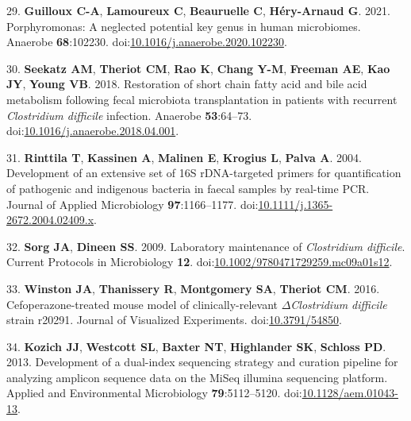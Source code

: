 \documentclass[
  12pt,
]{article}
\newenvironment{cslreferences}%
  {}%
  {\par}
\begin{document}
\begin{cslreferences}
\leavevmode\hypertarget{ref-Guilloux2021}{}%
29. \textbf{Guilloux C-A}, \textbf{Lamoureux C}, \textbf{Beauruelle C},
\textbf{Héry-Arnaud G}. 2021. Porphyromonas: A neglected potential key
genus in human microbiomes. Anaerobe \textbf{68}:102230.
doi:\href{https://doi.org/10.1016/j.anaerobe.2020.102230}{10.1016/j.anaerobe.2020.102230}.

\leavevmode\hypertarget{ref-Seekatz2018}{}%
30. \textbf{Seekatz AM}, \textbf{Theriot CM}, \textbf{Rao K},
\textbf{Chang Y-M}, \textbf{Freeman AE}, \textbf{Kao JY}, \textbf{Young
VB}. 2018. Restoration of short chain fatty acid and bile acid
metabolism following fecal microbiota transplantation in patients with
recurrent \emph{Clostridium difficile} infection. Anaerobe
\textbf{53}:64--73.
doi:\href{https://doi.org/10.1016/j.anaerobe.2018.04.001}{10.1016/j.anaerobe.2018.04.001}.

\leavevmode\hypertarget{ref-Rinttila2004}{}%
31. \textbf{Rinttila T}, \textbf{Kassinen A}, \textbf{Malinen E},
\textbf{Krogius L}, \textbf{Palva A}. 2004. Development of an extensive
set of 16S rDNA-targeted primers for quantification of pathogenic and
indigenous bacteria in faecal samples by real-time PCR. Journal of
Applied Microbiology \textbf{97}:1166--1177.
doi:\href{https://doi.org/10.1111/j.1365-2672.2004.02409.x}{10.1111/j.1365-2672.2004.02409.x}.

\leavevmode\hypertarget{ref-Sorg2009}{}%
32. \textbf{Sorg JA}, \textbf{Dineen SS}. 2009. Laboratory maintenance
of \emph{Clostridium difficile}. Current Protocols in Microbiology
\textbf{12}.
doi:\href{https://doi.org/10.1002/9780471729259.mc09a01s12}{10.1002/9780471729259.mc09a01s12}.

\leavevmode\hypertarget{ref-Winston2016}{}%
33. \textbf{Winston JA}, \textbf{Thanissery R}, \textbf{Montgomery SA},
\textbf{Theriot CM}. 2016. Cefoperazone-treated mouse model of
clinically-relevant \(\Delta\)\emph{Clostridium difficile} strain
r20291. Journal of Visualized Experiments.
doi:\href{https://doi.org/10.3791/54850}{10.3791/54850}.

\leavevmode\hypertarget{ref-Kozich2013}{}%
34. \textbf{Kozich JJ}, \textbf{Westcott SL}, \textbf{Baxter NT},
\textbf{Highlander SK}, \textbf{Schloss PD}. 2013. Development of a
dual-index sequencing strategy and curation pipeline for analyzing
amplicon sequence data on the MiSeq illumina sequencing platform.
Applied and Environmental Microbiology \textbf{79}:5112--5120.
doi:\href{https://doi.org/10.1128/aem.01043-13}{10.1128/aem.01043-13}.


\end{cslreferences}
\end{document}
